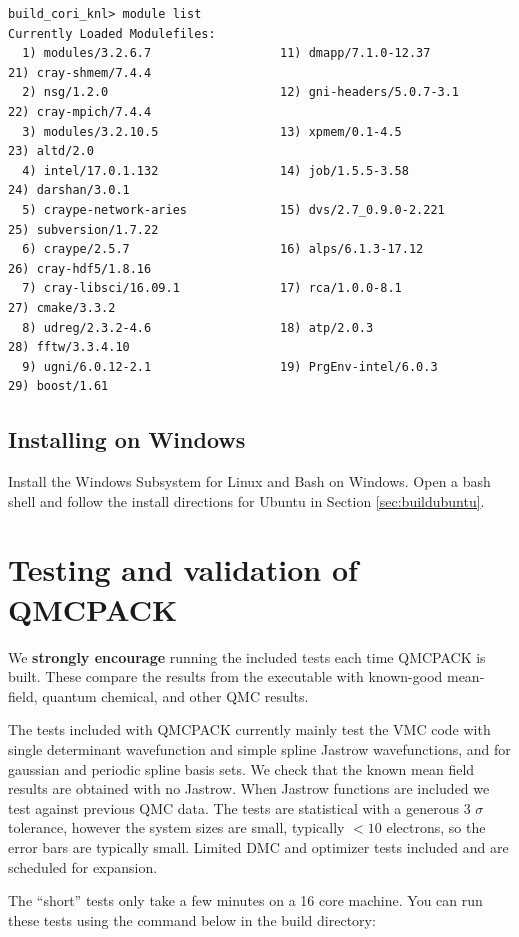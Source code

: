 \begin{verbatim}
build_cori_knl> module list
Currently Loaded Modulefiles:
  1) modules/3.2.6.7                  11) dmapp/7.1.0-12.37                21) cray-shmem/7.4.4
  2) nsg/1.2.0                        12) gni-headers/5.0.7-3.1            22) cray-mpich/7.4.4
  3) modules/3.2.10.5                 13) xpmem/0.1-4.5                    23) altd/2.0
  4) intel/17.0.1.132                 14) job/1.5.5-3.58                   24) darshan/3.0.1
  5) craype-network-aries             15) dvs/2.7_0.9.0-2.221              25) subversion/1.7.22
  6) craype/2.5.7                     16) alps/6.1.3-17.12                 26) cray-hdf5/1.8.16
  7) cray-libsci/16.09.1              17) rca/1.0.0-8.1                    27) cmake/3.3.2
  8) udreg/2.3.2-4.6                  18) atp/2.0.3                        28) fftw/3.3.4.10
  9) ugni/6.0.12-2.1                  19) PrgEnv-intel/6.0.3               29) boost/1.61
\end{verbatim}

\subsection{Installing on Windows}
Install the Windows Subsystem for Linux and Bash on Windows.
Open a bash shell and follow the install directions for Ubuntu in Section \ref{sec:buildubuntu}.

\section{Testing and validation of QMCPACK}
\label{sec:testing}
We \textbf{strongly encourage} running the included tests each time
QMCPACK is built. These compare the results from the executable with
known-good mean-field, quantum chemical, and other QMC results.

The tests included with QMCPACK currently mainly test the VMC code with
single determinant wavefunction and simple spline Jastrow
wavefunctions, and for gaussian and periodic spline basis
sets. We check that the known mean
field results are obtained with no Jastrow. When Jastrow functions are
included we test against previous QMC data. The tests are statistical
with a generous 3 $\sigma$ tolerance, however the system sizes are
small, typically $<10$ electrons, so the error bars are typically
small. Limited DMC and optimizer tests included and are scheduled for expansion.

 The ``short'' tests only take a few minutes on a 16
core machine. You can run these tests using the command below in the
build directory:

